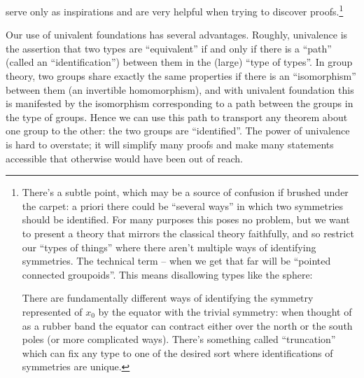 serve only as inspirations and are very helpful when trying to discover
proofs.\footnote{There's a subtle point, which may be a source of
  confusion if brushed under the carpet: a priori there could be ``several
  ways'' in which two symmetries should be identified. For many purposes this
  poses no problem, but we want to present a theory that mirrors the classical
  theory faithfully, and so restrict our ``types of things'' where there aren't
  multiple ways of identifying symmetries. The technical term -- when we get
  that far will be ``pointed connected groupoids''. This means disallowing types
  like the sphere:
  \begin{center}
  \end{center}
  There are fundamentally different ways of identifying the symmetry represented
  of $x_0$ by the equator with the trivial symmetry: when thought of as a rubber
  band the equator can contract either over the north or the south poles (or
  more complicated ways). There's something called ``truncation'' which can fix
  any type to one of the desired sort where identifications of symmetries are
  unique.}%

Our use of univalent foundations has several advantages. Roughly, univalence is the assertion that two types are ``equivalent'' if and only if there is a ``path'' (called an ``identification'') between them in the (large) ``type of types''. In group theory, two groups share exactly the same properties if there is an ``isomorphism'' between them (an invertible homomorphism), and with univalent foundation this is manifested by the isomorphism corresponding to a path between the groups in the type of groups. Hence we can use this path to transport any theorem about one group to the other: the two groups are ``identified''. The power of univalence is hard to overstate; it will simplify many proofs and make many statements accessible that otherwise would have been out of reach.

